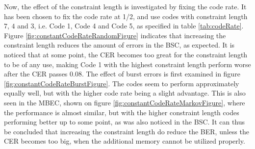 Now, the effect of the constraint length is investigated by fixing the code rate. It has been chosen to fix the code rate at 1/2, and use codes with constraint length $7$, $4$ and $3$, i.e. Code 1, Code 4 and Code 5, as specified in table \ref{tab:codeRate}.
\\[6pt]
Figure \ref{fig:constantCodeRateRandomFigure} indicates that increasing the constraint length reduces the amount of errors in the BSC, as expected. It is noticed that at some point, the CER becomes too great for the constraint length to be of any use, making Code 1 with the highest constraint length perform worse after the CER passes $0.08$.
The effect of burst errors is first examined in figure \ref{fig:constantCodeRateBurstFigure}. The codes seem to perform approximately equally well, but with the higher code rate being a slight advantage. This is also seen in the MBEC, shown on figure \ref{fig:constantCodeRateMarkovFigure}, where the performance is almost similar, but with the higher constraint length codes performing better up to some point, as was also noticed in the BSC.
It can thus be concluded that increasing the constraint length do reduce the BER, unless the CER becomes too big, when the additional memory cannot be utilized properly.

%


